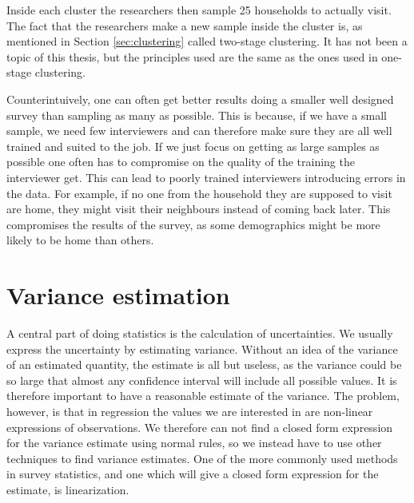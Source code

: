 \documentclass{article}
\begin{document}
Inside each cluster the researchers then sample 25 households to actually
visit. The fact that the researchers make a new sample inside the cluster is, as
mentioned in Section \ref{sec:clustering}
called two-stage clustering. It has not been a topic of this thesis, but the
principles used are the same as the ones used in one-stage clustering. \cite{DHS}

Counterintuively, one can often get better results doing a smaller well designed
survey than sampling as many as possible. This is because, if we have a small
sample, we need few interviewers and can therefore make sure
they are all well trained and suited to the job. If we just focus on getting as
large samples as possible one often has to compromise on the quality of the
training the interviewer get. This can lead to poorly trained interviewers introducing errors
in the data. For example, if no one from the household they are supposed to visit are
home, they might visit their neighbours instead of coming back later. This compromises the results of
the survey, as some demographics might be more likely to be home than others.

\section{Variance estimation} \label{sec:VarEst}

A central part of doing statistics is the calculation of uncertainties. We
usually express the uncertainty by estimating variance. Without an idea of the
variance of an estimated quantity, the estimate is all but useless, as the variance
could be so large that almost any confidence interval will include all possible
values. It is therefore important to have a reasonable estimate of the
variance. The problem, however, is that in regression the values we are
interested in are non-linear expressions of observations. We therefore can not find a closed form
expression for the variance estimate using normal rules, so we instead have to
use other techniques to
find variance estimates. One of the more commonly used methods in survey
statistics, and one which will give a closed form expression for the estimate,
is linearization.
\end{document}
